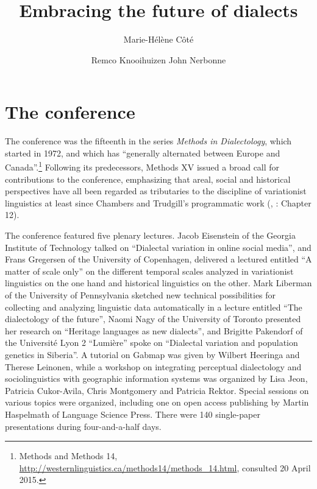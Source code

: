 \documentclass[output=paper]{LSP/langsci}
\author{Marie-Hélène Côté\affiliation{Université Laval}\and Remco Knooihuizen\affiliation{University of Groningen}     \lastand John Nerbonne\affiliation{University of Groningen, University of Freiburg}}
\title{Embracing the future of dialects}
\begin{document}
% 


\textit{  }

\section{The conference}
The conference was the fifteenth in the series \textit{Methods in Dialectology}, which started in 1972, and which has “generally alternated between Europe and Canada”.\footnote{Methods and Methods 14, \url{http://westernlinguistics.ca/methods14/methods_14.html}, consulted 20 April 2015.} Following its predecessors, Methods XV issued a broad call for contributions to the conference, emphasizing that areal, social and historical perspectives have all been regarded as tributaries to the discipline of variationist linguistics at least since Chambers and Trudgill’s programmatic work (\citealt{chambers_dialectology_1980}, \citealt{chambers_dialectology_1998}: Chapter 12).

The conference featured five plenary lectures. Jacob Eisenstein of the Georgia Institute of Technology talked on “Dialectal variation in online social media”, and Frans Gregersen of  the University of Copenhagen, delivered a lectured entitled “A matter of scale only” on the different temporal scales analyzed in variationist linguistics on the one hand and historical linguistics on the other. Mark Liberman of the University of Pennsylvania sketched new technical possibilities for collecting and analyzing linguistic data automatically in a lecture entitled “The dialectology of the future”, Naomi Nagy of the University of Toronto presented her research on “Heritage languages as new dialects”, and Brigitte Pakendorf of the Université Lyon 2 “Lumière” spoke on “Dialectal variation and population genetics in Siberia”.  A tutorial on Gabmap \citep{nerbonne_gabmap_2011} was given by Wilbert Heeringa and Therese Leinonen, while a workshop on integrating perceptual dialectology and sociolinguistics with geographic information systems was organized by Lisa Jeon, Patricia Cukor-Avila, Chris Montgomery and Patricia Rektor. Special sessions on various topics were organized, including one on open access publishing by Martin Haspelmath of Language Science Press.  There were 140 single-paper presentations during four-and-a-half days.
\end{document}
